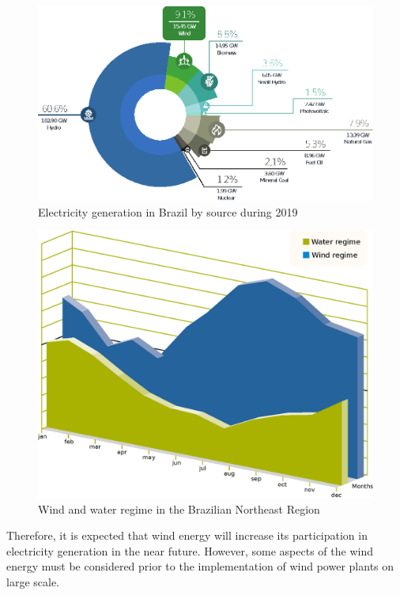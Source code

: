 \begin{figure}[ht]
	\caption{Electricity generation in Brazil by source during 2019}
	\begin{center}
		\includegraphics[scale=1]{Images/BRshare20.eps}
	\end{center}
	\label{fig: BRshare}
\end{figure}

\begin{figure}[hb]
	\caption{Wind and water regime in the Brazilian Northeast Region}
	\begin{center}
		\includegraphics[scale=0.5]{Images/WindWater.eps}
	\end{center}
	\label{fig: WindWater}
\end{figure}

Therefore, it is expected that wind energy will increase its participation in electricity generation in the near future. However, some aspects of the wind energy must be considered prior to the implementation of wind power plants on large scale.

